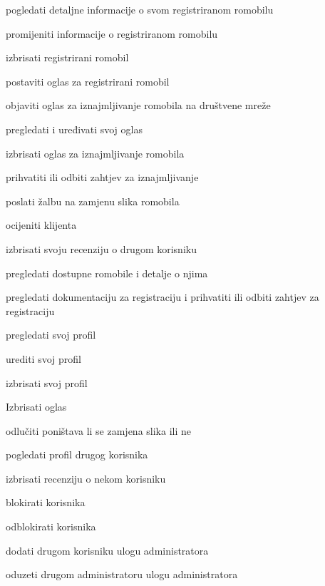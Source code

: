 \begin{packed_enum}
				\begin{packed_enum}
				\item pogledati detaljne informacije o svom registriranom romobilu
				\item promijeniti informacije o registriranom romobilu
				\item izbrisati registrirani romobil
				\item postaviti oglas za registrirani romobil
				\item objaviti oglas za iznajmljivanje romobila na društvene mreže
				\item pregledati i uređivati svoj oglas
				\item izbrisati oglas za iznajmljivanje romobila
				\item prihvatiti ili odbiti zahtjev za iznajmljivanje
				\item poslati žalbu na zamjenu slika romobila 
				\item ocijeniti klijenta
				\item izbrisati svoju recenziju o drugom korisniku
				
			\end{packed_enum}
			\item  {}
			
			\begin{packed_enum}
		
			\item pregledati dostupne romobile i detalje o njima
			\item pregledati dokumentaciju za registraciju i prihvatiti ili odbiti zahtjev za registraciju
			\item pregledati svoj profil
			\item urediti svoj profil
			\item izbrisati svoj profil
			\item Izbrisati oglas
			\item odlučiti poništava li se zamjena slika ili ne
			\item pogledati profil drugog korisnika
			\item izbrisati recenziju o nekom korisniku
			\item blokirati korisnika
			\item odblokirati korisnika
			\item dodati drugom korisniku ulogu administratora
			\item oduzeti drugom administratoru ulogu administratora
			
			
		

\end{packed_enum}
\end{packed_enum}
